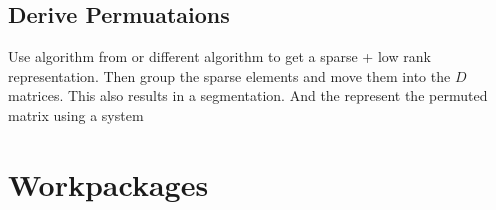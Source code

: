 \documentclass[lang=ngerman,inputenc=utf8,fontsize=10pt]{ldvarticle}
\begin{document}
\subsection*{Derive Permuataions}
Use algorithm from \cite{ulfarsson_sparse_2015} or different algorithm to get a sparse + low rank representation.
Then group the sparse elements and move them into the $D$ matrices.
This also results in a segmentation.
And the represent the permuted matrix using a system 


%
%



\section{Workpackages}
\end{document}
